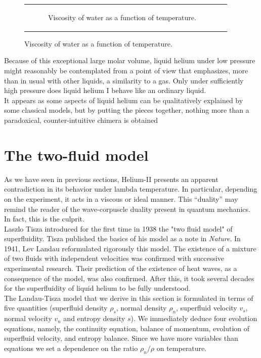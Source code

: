 \documentclass{article}
\begin{document}
\begin{figure}[H]
\begin{tabular}{cc}
\begin{subfigure}{0.5\textwidth}
            \caption{Viscosity of water as a function of temperature.}
            \label{fig:enter-label}
        \end{subfigure}
   
    \end{tabular}
\end{figure}

Because of this exceptional large molar volume, liquid helium under low pressure might reasonably be contemplated from a point of view that emphasizes, more than in usual with other liquids, a similarity to a gas. Only under sufficiently high pressure does liquid helium I behave like an ordinary liquid.
\\

It appears as some aspects of liquid helium can be qualitatively explained by some classical models, but by putting the pieces together, nothing more than a paradoxical, counter-intuitive chimera is obtained

\section{The two-fluid model}

As we have seen in previous sections,  Helium-II presents an apparent contradiction in its behavior under lambda temperature. In particular, depending on the experiment, it acts in a viscous or ideal manner. This “duality” may remind the reader of the wave-corpuscle duality present in quantum mechanics. In fact, this is the culprit.
\\

Laszlo Tisza introduced for the first time in 1938 the "two fluid model" of superfluidity. Tisza published the basics of his model as a note in \textit{Nature}. In 1941, Lev Landau reformulated rigorously this model. The existence of a mixture of two fluids with independent velocities was confirmed with successive experimental research. Their prediction of the existence of heat waves, as a consequence of the model, was also confirmed. After this, it took several decades for the superfluidity of liquid helium to be fully understood.
\\

The Landau-Tisza model that we derive in this section is formulated in terms of five quantities (superfluid density $\rho_s$, normal density $\rho_n$, superfluid velocity $v_s$, normal velocity $v_n$ and entropy density $s$). We immediately deduce four evolution equations, namely, the continuity equation, balance of momentum, evolution of superfluid velocity, and entropy balance. Since we have more variables than equations we set a dependence on the ratio $\rho_n/\rho$ on temperature. 
\\
\end{document}
